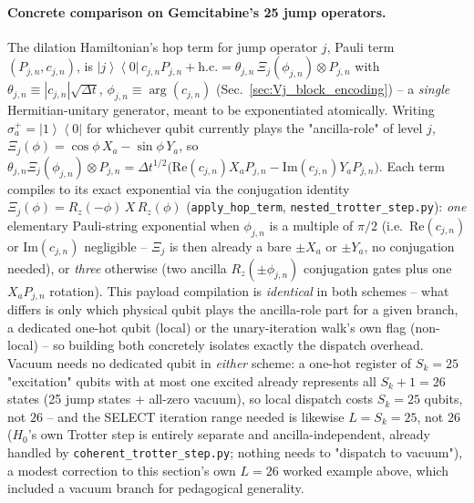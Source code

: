 \documentclass[11pt]{article}
\newcommand{\Dt}{\Delta t}
\renewcommand{\ket}[1]{\left| #1 \right\rangle}
\renewcommand{\bra}[1]{\left\langle #1 \right|}
\begin{document}
\paragraph{Concrete comparison on Gemcitabine's 25 jump operators.} The dilation Hamiltonian's hop term for jump operator $j$, Pauli term $(P_{j,n},c_{j,n})$, is $\ket{j}\bra0\,c_{j,n}P_{j,n}+\text{h.c.} = \theta_{j,n}\,\Xi_j(\phi_{j,n})\otimes P_{j,n}$ with $\theta_{j,n}\equiv|c_{j,n}|\sqrt{\Dt}$, $\phi_{j,n}\equiv\arg(c_{j,n})$ (Sec.~\ref{sec:Vj_block_encoding}) -- a \emph{single} Hermitian-unitary generator, meant to be exponentiated atomically. Writing $\sigma_a^+=\ket1\bra0$ for whichever qubit currently plays the "ancilla-role" of level $j$, $\Xi_j(\phi)=\cos\phi\,X_a-\sin\phi\,Y_a$, so $\theta_{j,n}\Xi_j(\phi_{j,n})\otimes P_{j,n}=\Dt^{1/2}\big(\text{Re}(c_{j,n})X_aP_{j,n}-\text{Im}(c_{j,n})Y_aP_{j,n}\big)$. Each term compiles to its exact exponential via the conjugation identity $\Xi_j(\phi)=R_z(-\phi)\,X\,R_z(\phi)$ (\texttt{apply\_hop\_term}, \texttt{nested\_trotter\_step.py}): \emph{one} elementary Pauli-string exponential when $\phi_{j,n}$ is a multiple of $\pi/2$ (i.e.\ $\text{Re}(c_{j,n})$ or $\text{Im}(c_{j,n})$ negligible -- $\Xi_j$ is then already a bare $\pm X_a$ or $\pm Y_a$, no conjugation needed), or \emph{three} otherwise (two ancilla $R_z(\pm\phi_{j,n})$ conjugation gates plus one $X_aP_{j,n}$ rotation). This payload compilation is \emph{identical} in both schemes -- what differs is only which physical qubit plays the ancilla-role part for a given branch, a dedicated one-hot qubit (local) or the unary-iteration walk's own flag (non-local) -- so building both concretely isolates exactly the dispatch overhead. Vacuum needs no dedicated qubit in \emph{either} scheme: a one-hot register of $S_k=25$ "excitation" qubits with at most one excited already represents all $S_k+1=26$ states (25 jump states + all-zero vacuum), so local dispatch costs $S_k=25$ qubits, not $26$ -- and the SELECT iteration range needed is likewise $L=S_k=25$, not $26$ ($H_0$'s own Trotter step is entirely separate and ancilla-independent, already handled by \texttt{coherent\_trotter\_step.py}; nothing needs to "dispatch to vacuum"), a modest correction to this section's own $L=26$ worked example above, which included a vacuum branch for pedagogical generality.
\end{document}
